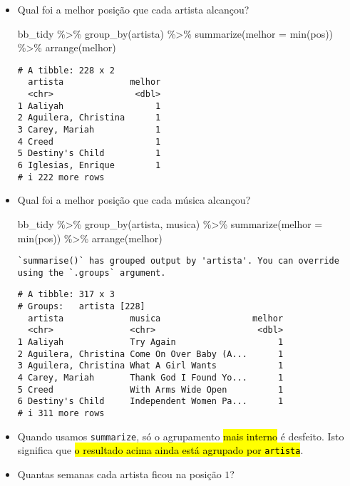\documentclass[
  letterpaper,
  DIV=11,
  numbers=noendperiod]{scrreprt}
\newenvironment{Shaded}{\begin{snugshade}}{\end{snugshade}}
\newcommand{\AttributeTok}[1]{\textcolor[rgb]{0.40,0.45,0.13}{#1}}
\newcommand{\FunctionTok}[1]{\textcolor[rgb]{0.28,0.35,0.67}{#1}}
\newcommand{\NormalTok}[1]{\textcolor[rgb]{0.00,0.23,0.31}{#1}}
\newcommand{\SpecialCharTok}[1]{\textcolor[rgb]{0.37,0.37,0.37}{#1}}
\begin{document}
\begin{itemize}
\item
  Qual foi a melhor posição que cada artista alcançou?

\begin{Shaded}
\begin{Highlighting}[]
\NormalTok{bb\_tidy }\SpecialCharTok{\%\textgreater{}\%} 
  \FunctionTok{group\_by}\NormalTok{(artista) }\SpecialCharTok{\%\textgreater{}\%} 
  \FunctionTok{summarize}\NormalTok{(}\AttributeTok{melhor =} \FunctionTok{min}\NormalTok{(pos)) }\SpecialCharTok{\%\textgreater{}\%} 
  \FunctionTok{arrange}\NormalTok{(melhor)}
\end{Highlighting}
\end{Shaded}

\begin{verbatim}
# A tibble: 228 x 2
  artista             melhor
  <chr>                <dbl>
1 Aaliyah                  1
2 Aguilera, Christina      1
3 Carey, Mariah            1
4 Creed                    1
5 Destiny's Child          1
6 Iglesias, Enrique        1
# i 222 more rows
\end{verbatim}
\item
  Qual foi a melhor posição que cada música alcançou?

\begin{Shaded}
\begin{Highlighting}[]
\NormalTok{bb\_tidy }\SpecialCharTok{\%\textgreater{}\%} 
  \FunctionTok{group\_by}\NormalTok{(artista, musica) }\SpecialCharTok{\%\textgreater{}\%} 
  \FunctionTok{summarize}\NormalTok{(}\AttributeTok{melhor =} \FunctionTok{min}\NormalTok{(pos)) }\SpecialCharTok{\%\textgreater{}\%} 
  \FunctionTok{arrange}\NormalTok{(melhor)}
\end{Highlighting}
\end{Shaded}

\begin{verbatim}
`summarise()` has grouped output by 'artista'. You can override
using the `.groups` argument.
\end{verbatim}

\begin{verbatim}
# A tibble: 317 x 3
# Groups:   artista [228]
  artista             musica                  melhor
  <chr>               <chr>                    <dbl>
1 Aaliyah             Try Again                    1
2 Aguilera, Christina Come On Over Baby (A...      1
3 Aguilera, Christina What A Girl Wants            1
4 Carey, Mariah       Thank God I Found Yo...      1
5 Creed               With Arms Wide Open          1
6 Destiny's Child     Independent Women Pa...      1
# i 311 more rows
\end{verbatim}
\item
  Quando usamos \texttt{summarize}, só o agrupamento {\hl{mais interno}}
  é desfeito. Isto significa que {\hl{o resultado acima ainda está
  agrupado por {\mbox{\texttt{artista}}}}}.
\item
  Quantas semanas cada artista ficou na posição $1$?


\end{itemize}
\end{document}
